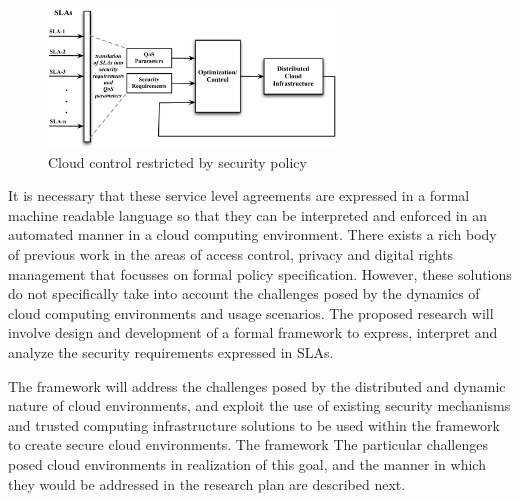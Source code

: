 \documentclass[10pt, conference, compsoc]{IEEEtran}
\begin{document}
\begin{figure}[!t]
\centering
\includegraphics[width=3in]{cloud-security.pdf}
\caption{Cloud control restricted by security policy}
\label{fig:cloud-security}
\end{figure}

It is necessary that these service level agreements are expressed in a formal machine readable language so that they can be interpreted and enforced in an automated manner in a cloud computing environment. There exists a rich body of previous work in the areas of access control, privacy and digital rights management that focusses on formal policy specification. However,  these solutions do not specifically take into account the challenges posed by the dynamics of cloud computing environments and usage scenarios. The proposed research will involve design and development of a formal framework to express, interpret and analyze the security requirements expressed in SLAs. 

The framework will address the challenges posed by the distributed and dynamic nature of cloud environments, and exploit the use of existing security mechanisms and trusted computing infrastructure solutions to be used within the framework to create secure cloud environments. The framework The particular challenges posed cloud environments in realization of this goal, and the manner in which they would be addressed in the research plan are described next.
\end{document}
